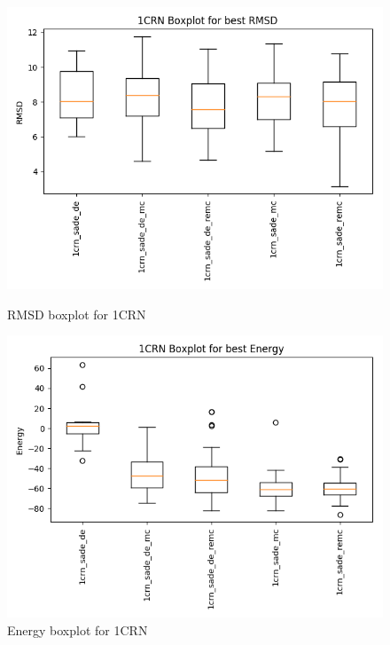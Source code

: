 \begin{figure}[ht]
    \begin{minipage}[b]{0.45\linewidth}
        \centering
        \includegraphics[width=\textwidth]{Figuras/boxplots/1crn_rmsd_boxplot.png}
        \caption{RMSD boxplot for 1CRN}
        \label{fig:1crn-rmsd-boxplot}
    \end{minipage}
    \hspace{0.5cm}
    \begin{minipage}[b]{0.45\linewidth}
        \centering
        \includegraphics[width=\textwidth]{Figuras/boxplots/1crn_energy_boxplot.png}
        \caption{Energy boxplot for 1CRN}
        \label{fig:1crn-energy-boxplot}
    \end{minipage}
\end{figure}

